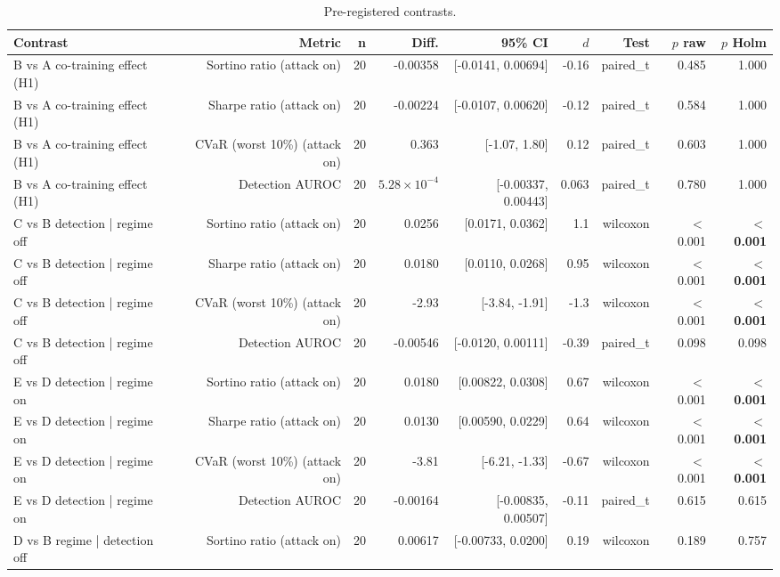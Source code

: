 \begin{table}[htbp]
  \centering
  \caption{Pre-registered contrasts.}
  \label{tab:contrasts}
  \begin{tabular}{lrrrrrrrr}
    \toprule
    Contrast & Metric & n & Diff. & 95\% CI & $d$ & Test & $p$ raw & $p$ Holm \\
    \midrule
    B vs A   co-training effect (H1) & Sortino ratio (attack on) & 20 & -0.00358 & [-0.0141, 0.00694] & -0.16 & paired\_t & 0.485 & 1.000 \\
    B vs A   co-training effect (H1) & Sharpe ratio (attack on) & 20 & -0.00224 & [-0.0107, 0.00620] & -0.12 & paired\_t & 0.584 & 1.000 \\
    B vs A   co-training effect (H1) & CVaR (worst 10\%) (attack on) & 20 & 0.363 & [-1.07, 1.80] & 0.12 & paired\_t & 0.603 & 1.000 \\
    B vs A   co-training effect (H1) & Detection AUROC & 20 & $5.28\times10^{-4}$ & [-0.00337, 0.00443] & 0.063 & paired\_t & 0.780 & 1.000 \\
    C vs B   detection | regime off & Sortino ratio (attack on) & 20 & 0.0256 & [0.0171, 0.0362] & 1.1 & wilcoxon & $<$0.001 & \textbf{$<$0.001} \\
    C vs B   detection | regime off & Sharpe ratio (attack on) & 20 & 0.0180 & [0.0110, 0.0268] & 0.95 & wilcoxon & $<$0.001 & \textbf{$<$0.001} \\
    C vs B   detection | regime off & CVaR (worst 10\%) (attack on) & 20 & -2.93 & [-3.84, -1.91] & -1.3 & wilcoxon & $<$0.001 & \textbf{$<$0.001} \\
    C vs B   detection | regime off & Detection AUROC & 20 & -0.00546 & [-0.0120, 0.00111] & -0.39 & paired\_t & 0.098 & 0.098 \\
    E vs D   detection | regime on & Sortino ratio (attack on) & 20 & 0.0180 & [0.00822, 0.0308] & 0.67 & wilcoxon & $<$0.001 & \textbf{$<$0.001} \\
    E vs D   detection | regime on & Sharpe ratio (attack on) & 20 & 0.0130 & [0.00590, 0.0229] & 0.64 & wilcoxon & $<$0.001 & \textbf{$<$0.001} \\
    E vs D   detection | regime on & CVaR (worst 10\%) (attack on) & 20 & -3.81 & [-6.21, -1.33] & -0.67 & wilcoxon & $<$0.001 & \textbf{$<$0.001} \\
    E vs D   detection | regime on & Detection AUROC & 20 & -0.00164 & [-0.00835, 0.00507] & -0.11 & paired\_t & 0.615 & 0.615 \\
    D vs B   regime | detection off & Sortino ratio (attack on) & 20 & 0.00617 & [-0.00733, 0.0200] & 0.19 & wilcoxon & 0.189 & 0.757 \\

\end{tabular}
\end{table}
